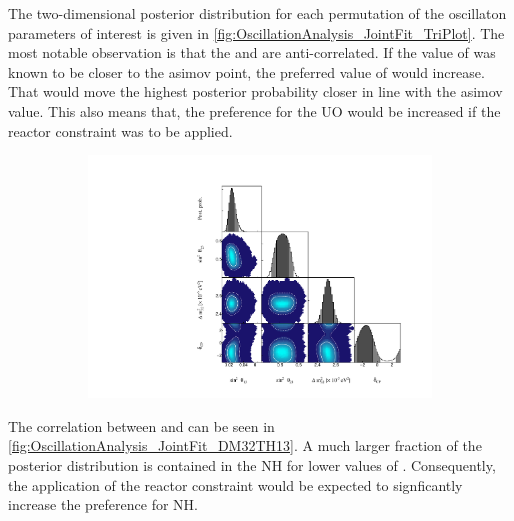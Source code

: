 The two-dimensional posterior distribution for each permutation of the oscillaton parameters of interest is given in \autoref{fig:OscillationAnalysis_JointFit_TriPlot}. The most notable observation is that the \sinsqreac and \sinsqatm are anti-correlated. If the value of \sinsqreac was known to be closer to the asimov point, the preferred value of \sinsqatm would increase. That would move the highest posterior probability closer in line with the asimov value. This also means that, the preference for the UO would be increased if the reactor constraint was to be applied. 

\begin{figure}[h]
  \begin{subfigure}[t]{1.0\textwidth}
    \includegraphics[width=\textwidth, trim={0mm 0mm 0mm 0mm}, clip,page=1]{Figures/OA/JointFit/Contours_1D_woRC_UnSmeared_CredibleInterval_TrianglePlot.pdf}
  \end{subfigure}
  \caption{}
  \label{fig:OscillationAnalysis_JointFit_TriPlot}
\end{figure}

The correlation between \sinsqreac and \delmsqatm can be seen in \autoref{fig:OscillationAnalysis_JointFit_DM32TH13}. A much larger fraction of the posterior distribution is contained in the NH for lower values of \sinsqreac. Consequently, the application of the reactor constraint would be expected to signficantly increase the preference for NH.

